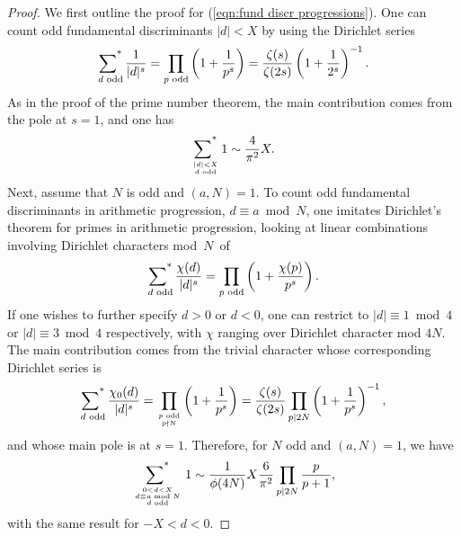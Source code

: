 \documentclass[12pt,letterpaper]{amsart}
\theoremstyle{plain}
\theoremstyle{definition}
\theoremstyle{remark}
\numberwithin{equation}{subsection}
\numberwithin{theorem}{subsection}
\numberwithin{table}{subsection}
\newcommand{\ontop}[2]{\genfrac{}{}{0pt}{}{#1}{#2}}
\renewcommand{\mod}{\bmod}
\def\sumstar{\operatornamewithlimits{\sum\nolimits^*}}
\begin{document}
\begin{proof}
We first outline the proof for (\ref{eqn:fund discr progressions}). One can count 
odd fundamental discriminants $|d|< X$ by using the Dirichlet series
\begin{equation}
    \sumstar_{\text{$d$ odd}} \frac{1}{|d|^s} = 
    \prod_{\text{$p$ odd}} \left( 1+\frac{1}{p^s}\right) =
    \frac{\zeta(s)}{\zeta(2s)} \left( 1+\frac{1}{2^s}\right)^{-1}.
\end{equation}
As in the proof of the prime number theorem, the main contribution comes from the pole at $s=1$,
and one has 
\begin{equation}
    \sumstar_{\ontop{|d| < X}{\text{$d$ odd}}} 1
    \sim 
    \frac{4}{\pi^2} X.
\end{equation}
Next, assume that $N$ is odd and $(a,N)=1$. To count odd fundamental discriminants in arithmetic progression,
$d \equiv a \mod N$, one imitates Dirichlet's theorem for primes in arithmetic progression,
looking at linear combinations involving Dirichlet characters mod~$N$~of
\begin{equation}
    \sumstar_{\text{$d$ odd}} \frac{\chi(d)}{|d|^s} = 
    \prod_{\text{$p$ odd}} \left( 1+\frac{\chi(p)}{p^s}\right).
\end{equation}
If one wishes to further specify $d>0$ or $d<0$, one can restrict to 
$|d| \equiv 1 \mod 4$ or $|d| \equiv 3 \mod 4$ respectively, with $\chi$ ranging
over Dirichlet character mod $4N$. The main contribution comes from the
trivial character whose corresponding Dirichlet series is
\begin{equation}
    \label{eqn:trivial character fund discr}
    \sumstar_{\text{$d$ odd}} \frac{\chi_0(d)}{|d|^s} = 
    \prod_{\ontop{\text{$p$ odd}}{p \nmid N}} \left( 1+\frac{1}{p^s}\right)=
    \frac{\zeta(s)}{\zeta(2s)} \prod_{p \mid 2N} \left( 1+\frac{1}{p^s}\right)^{-1},
\end{equation}
and whose main pole is at $s=1$. Therefore, for $N$ odd and $(a,N)=1$, we have
\begin{equation}
    \sumstar_{\ontop{0 < d < X}{\ontop {d \equiv a \bmod N}{\text{$d$ odd}}}} 1
    \sim \frac{1}{\phi(4N)} X \frac{6}{\pi^2}
    \prod_{p|2N} \frac{p}{p+1},
\end{equation}
with the same result for $-X < d < 0$. 


\end{proof}
\end{document}
